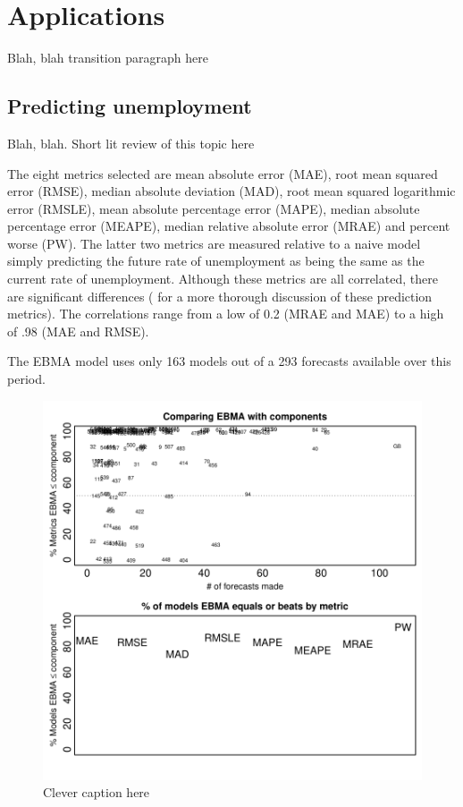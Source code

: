 \documentclass[12pt,fullpage,endnotes]{article}
\begin{document}

\section{Applications}
\label{empirics}

Blah, blah transition paragraph here


\subsection{Predicting unemployment}

Blah, blah.  Short lit review of this topic here

The eight metrics selected are mean absolute error (MAE), root mean
squared error (RMSE), median absolute deviation (MAD), root mean
squared logarithmic error (RMSLE), mean absolute percentage error
(MAPE), median absolute percentage error (MEAPE), median relative
absolute error (MRAE) and percent worse (PW).  The latter two metrics
are measured relative to a naive model simply predicting the future
rate of unemployment as being the same as the current rate of
unemployment.  Although these metrics are all correlated, there are
significant differences (\citet[][]{brandt:freeman:schrodt:2011} for a
more thorough discussion of these prediction metrics).  The
correlations range from a low of 0.2 (MRAE and MAE) to a high of .98
(MAE and RMSE).

The EBMA model uses only 163 models out of a 293 forecasts available
over this period.

\begin{figure}[h!]
\caption{Clever caption here}
\begin{center}
\includegraphics{compare2Components}
\end{center}
\end{figure}
\end{document}
